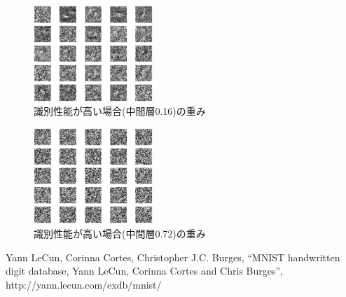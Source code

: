 \documentclass[10pt,a4paper,twocolumn]{jarticle}
\begin{document}
\begin{figure}[htbp] 
  \centering
  \includegraphics[width=0.4\textwidth]{assets/img/hidden_layer_analyze_mnist_image_nsamp70000_nh0.16.eps}
  \caption{識別性能が高い場合(中間層0.16)の重み}
  \label{fig:hidden-layer-analyze-img-0.16}
\end{figure}
\begin{figure}[htbp] 
  \centering
  \includegraphics[width=0.4\textwidth]{assets/img/hidden_layer_analyze_mnist_image_nsamp70000_nh0.72.eps}
  \caption{識別性能が高い場合(中間層0.72)の重み}
  \label{fig:hidden-layer-analyze-img-0.72}
\end{figure}


\begin{thebibliography}{9}
   Yann LeCun, Corinna Cortes, Christopher J.C. Burges,
    ``MNIST handwritten digit database, Yann LeCun, Corinna Cortes and Chris Burges'',
    http://yann.lecun.com/exdb/mnist/
\end{thebibliography}

\end{document}
